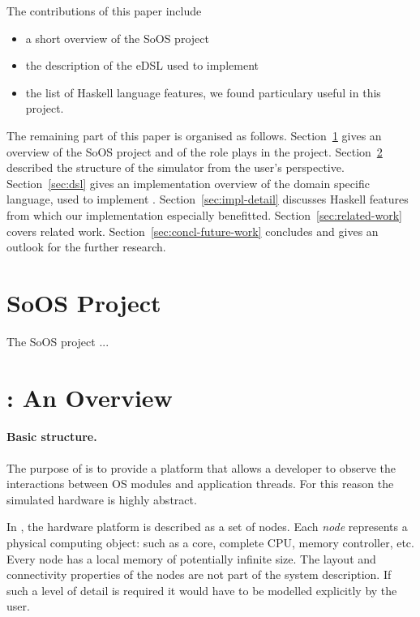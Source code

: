The contributions of this paper include
\begin{itemize}
\item a short overview of the SoOS project
\item the description of the eDSL used to implement \soosim 
\item the list of Haskell language features, we found particulary
  useful in this project.
\end{itemize}

The remaining part of this paper is organised as
follows. Section~\ref{sec:soos-project} gives an overview of the SoOS
project and of the role \soosim plays in the
project. Section~\ref{sec:soosim-an-overview} described the structure
of the \soosim simulator from the user's
perspective. Section~\ref{sec:dsl} gives an implementation overview of
the domain specific language, used to implement
\soosim. Section~\ref{sec:impl-detail} discusses Haskell features from
which our implementation especially
benefitted. Section~\ref{sec:related-work} covers related
work. Section~\ref{sec:concl-future-work} concludes and gives an
outlook for the further research.

\section{SoOS Project}
\label{sec:soos-project}

The SoOS project  \cite{soos}...

\section{\soosim: An Overview}
\label{sec:soosim-an-overview}

\paragraph{Basic structure.} 
The purpose of \soosim is to provide a platform that allows a
developer to observe the interactions between OS modules and
application threads.  For this reason the simulated hardware is highly
abstract.

In \soosim, the hardware platform is described as a set of nodes.
Each \emph{node} represents a physical computing object: such as a
core, complete CPU, memory controller, etc.  Every node has a local
memory of potentially infinite size.  The layout and connectivity
properties of the nodes are not part of the system description.  If
such a level of detail is required it would have to be modelled
explicitly by the user.


